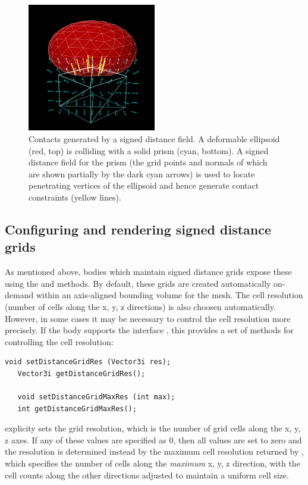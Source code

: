 \begin{figure}[ht]
\begin{center}
     \includegraphics[width=0.5\textwidth]{images/signedDistanceCollide}
\end{center}
\caption{Contacts generated by a signed distance field. A deformable
ellipsoid (red, top) is colliding with a solid prism (cyan, bottom).
A signed distance field for the prism (the grid points and normals of
which are shown partially by the dark cyan arrows) is used to locate
penetrating vertices of the ellipsoid and hence generate contact
constraints (yellow lines).}
\label{SDCollision:fig}
\end{figure}

\subsection{Configuring and rendering signed distance grids}

As mentioned above, bodies which maintain signed distance grids expose
these using the
and
methods. By default, these grids are created automatically on-demand
within an axis-aligned bounding volume for the mesh. The cell
resolution (number of cells along the x, y, z directions) is also
choosen automatically. However, in some cases it may be necessary to
control the cell resolution more precisely. If the body supports the
interface , this
provides a set of methods for controlling the cell resolution:
%
\begin{lstlisting}[]
   void setDistanceGridRes (Vector3i res);
   Vector3i getDistanceGridRes();

   void setDistanceGridMaxRes (int max);
   int getDistanceGridMaxRes();
\end{lstlisting}
%
explicity sets the grid resolution, which is the number of grid cells
along the x, y, z axes. If any of these values are specified as 0,
then all values are set to zero and the resolution is determined
instead by the maximum cell resolution returned by
,
which specifies the number of cells along the {\it maximum} x, y, z
direction, with the cell counts along the other directions adjusted to
maintain a uniform cell size.

